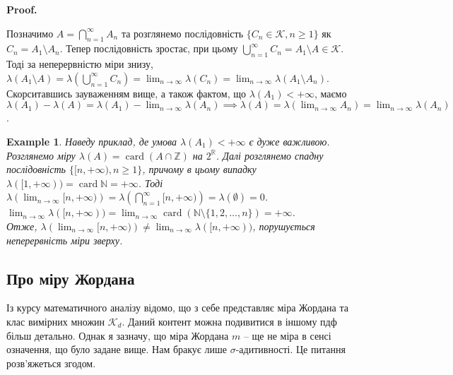 \documentclass[a4paper, 10pt]{article}
\makeatletter
\theoremstyle{theoremdd}
\newtheorem{example}[theorem]{Example}
\DeclareMathOperator{\card}{card}
\renewenvironment{proof}[1][Proof.\\]{\par
\pushQED{\hfill \qed}%
\normalfont \topsep6\p@\@plus6\p@\relax
\trivlist
\item\relax
{\bfseries
#1\@addpunct{.}}\hspace\labelsep\ignorespaces
}{%
\popQED\endtrivlist\@endpefalse
}
\makeatother
\begin{document}
\begin{proof}
Позначимо $A = \displaystyle\bigcap_{n=1}^\infty A_n$ та розглянемо послідовність $\{C_n \in \mathcal{K}, n \geq 1\}$ як $C_n = A_1 \setminus A_n$. Тепер послідовність зростає, при цьому $\displaystyle\bigcup_{n=1}^\infty C_n = A_1 \setminus A \in \mathcal{K}$. Тоді за неперервністю міри знизу,\\
$\lambda(A_1 \setminus A) = \displaystyle\lambda\left( \bigcup_{n=1}^\infty C_n \right) = \lim_{n \to \infty} \lambda\left(C_n\right) = \lim_{n \to \infty} \lambda(A_1 \setminus A_n)$.\\
Скорситавшись зауваженням вище, а також фактом, що $\lambda(A_1) < +\infty$, маємо\\
$\displaystyle\lambda(A_1) - \lambda(A) = \lambda(A_1) - \lim_{n \to \infty} \lambda(A_n) \implies \lambda(A) = \lambda\left( \lim_{n \to \infty} A_n \right) = \lim_{n \to \infty} \lambda(A_n)$.
\end{proof}

\begin{example}
Наведу приклад, де умова $\lambda(A_1) < +\infty$ є дуже важливою.\\
Розглянемо міру $\lambda(A) = \card (A \cap \mathbb{Z})$ на $2^{\mathbb{R}}$. Далі розглянемо спадну послідовність $\{ [n,+\infty), n \geq 1 \}$, причому в цьому випадку $\lambda([1,+\infty)) = \card \mathbb{N} = +\infty$. Тоді\\
$\displaystyle\lambda\left( \lim_{n \to \infty} [n,+\infty) \right) = \lambda\left( \bigcap_{n=1}^\infty [n,+\infty) \right) = \lambda(\emptyset) = 0$.\\
$\displaystyle\lim_{n \to \infty} \lambda([n,+\infty)) = \lim_{n \to \infty} \card (\mathbb{N} \setminus \{1,2,\dots,n\}) = +\infty$.\\
Отже, $\displaystyle\lambda\left( \lim_{n \to \infty} [n,+\infty) \right) \neq \lim_{n \to \infty} \lambda([n,+\infty))$, порушується неперервність міри зверху.
\end{example}

\subsection{Про міру Жордана}
Із курсу математичного аналізу відомо, що з себе представляє міра Жордана та клас вимірних множин $\mathcal{K}_d$. Даний контент можна подивитися в іншому пдф більш детально. Однак я зазначу, що міра Жордана $m$ -- ще не міра в сенсі означення, що було задане вище. Нам бракує лише $\sigma$-адитивності. Це питання розв'яжеться згодом.
\end{document}
